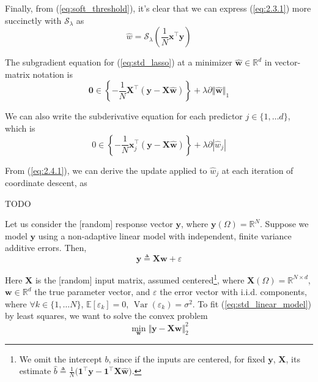 \documentclass{article}
\numberwithin{equation}{section}
\begin{document}
Finally, from (\ref{eq:soft_threshold}), it's clear that we can express
(\ref{eq:2.3.1}) more succinctly with $ \mathcal{S}_\lambda $ as
\begin{equation*}
    \hat{w} =
    \mathcal{S}_\lambda\left(\frac{1}{N}\mathbf{x}^\top\mathbf{y}\right)
\end{equation*}


The subgradient equation for (\ref{eq:std_lasso}) at a minimizer
$ \mathbf{\hat{w}} \in \mathbb{R}^d $ in vector-matrix notation is
\begin{equation*}
    \mathbf{0} \in \left\{
        -\frac{1}{N}\mathbf{X}^\top(
            \mathbf{y} - \mathbf{X}\hat{\mathbf{w}}
        )
    \right\} +
    \lambda\partial\Vert\hat{\mathbf{w}}\Vert_1
\end{equation*}

We can also write the subderivative equation for each predictor $ j \in
\{1, \ldots d\} $, which is
\begin{equation} \label{eq:2.4.1}
    0 \in \left\{
        -\frac{1}{N}\mathbf{x}_j^\top(\mathbf{y} - \mathbf{X}\hat{\mathbf{w}})
    \right\} +
    \lambda\partial|\hat{w}_j|
\end{equation}

From (\ref{eq:2.4.1}), we can derive the update applied to $ \hat{w}_j $ at
each iteration of coordinate descent, as

\medskip

TODO


Let us consider the [random] response vector $ \mathbf{y} $, where
$ \mathbf{y}(\Omega) = \mathbb{R}^N $. Suppose we model $ \mathbf{y} $
using a non-adaptive linear model with independent, finite variance
additive errors. Then,
\begin{equation} \label{eq:std_linear_model}
    \mathbf{y} \triangleq \mathbf{Xw} + \varepsilon
\end{equation}

Here $ \mathbf{X} $ is the [random] input matrix, assumed
centered\footnote{
    We omit the intercept $ b $, since if the inputs are centered, for
    fixed $ \mathbf{y} $, $ \mathbf{X} $, its estimate $ \hat{b} \triangleq
    \frac{1}{N}\big(\mathbf{1}^\top\mathbf{y} -
    \mathbf{1}^\top\mathbf{X}\hat{\mathbf{w}}\big) $.
}, where $ \mathbf{X}(\Omega) = \mathbb{R}^{N \times d} $, $ \mathbf{w} \in
\mathbb{R}^d $ the true parameter vector, and $ \varepsilon $ the error
vector with i.i.d. components, where $ \forall k \in\{1, \ldots N\} $,
$ \mathbb{E}[\varepsilon_k] = 0 $, $ \operatorname{Var}(\varepsilon_k) =
\sigma^2 $. To fit (\ref{eq:std_linear_model}) by least squares, we want to
solve the convex problem
\begin{equation} \label{eq:std_linear_lsq}
    \min_\mathbf{w}\Vert\mathbf{y} - \mathbf{Xw}\Vert_2^2
\end{equation}
\end{document}
